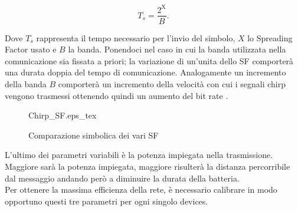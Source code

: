 \begin{equation}\label{eq:time_chirp}
        T_s=\frac{2^{\text{X}}}{B}.
\end{equation}

Dove $T_s$ rappresenta il tempo necessario per
l'invio del simbolo, $X$ lo Spreading Factor usato e $B$ la banda.
Ponendoci nel caso in cui la banda utilizzata nella comunicazione sia fissata a
priori; la variazione di un'unita dello SF comporterà una durata doppia del
tempo di comunicazione.
Analogamente un incremento della banda $B$ comporterà un
incremento della velocità con cui i segnali chirp vengono trasmessi ottenendo
quindi un aumento del bit rate .

\begin{figure}[ht]
        \centering 
        {Chirp_SF.eps_tex}
                \caption{Comparazione simbolica dei vari SF}
        \label{fig:sf_var}
\end{figure}

L'ultimo dei parametri variabili è la potenza impiegata nella trasmissione.
Maggiore sarà la potenza impiegata, maggiore risulterà la distanza percorribile
dal messaggio andando però a diminuire la durata della batteria.\\
Per ottenere la massima efficienza della rete, è necessario calibrare in modo
opportuno questi tre parametri per ogni singolo devices. 

